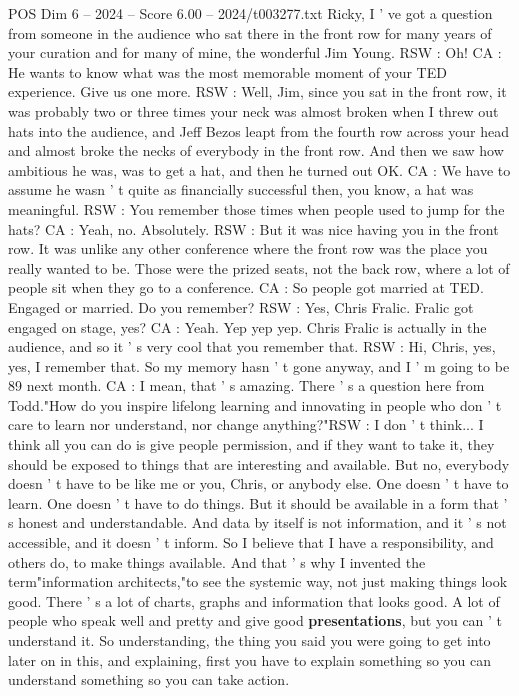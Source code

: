 \begin{textsample}{POS Dim 6 – 2024 – Score 6.00 – 2024/t003277.txt}
Ricky, I ' ve got a question from someone in the audience who sat there in the front row for many years of your curation and for many of mine, the wonderful Jim Young.
RSW : Oh!
CA : He wants to know what was the most memorable moment of your TED experience.
Give us one more.
RSW : Well, Jim, since you sat in the front row, it was probably two or three times your neck was almost broken when I threw out hats into the audience, and Jeff Bezos leapt from the fourth row across your head and almost broke the necks of everybody in the front row.
And then we saw how ambitious he was, was to get a hat, and then he turned out OK.
CA : We have to assume he wasn ' t quite as financially successful then, you know, a hat was meaningful.
RSW : You remember those times when people used to jump for the hats?
CA : Yeah, no.
Absolutely.
RSW : But it was nice having you in the front row.
It was unlike any other conference where the front row was the place you really wanted to be.
Those were the prized seats, not the back row, where a lot of people sit when they go to a conference.
CA : So people got married at TED.
Engaged or married.
Do you remember?
RSW : Yes, Chris Fralic.
Fralic got engaged on stage, yes?
CA : Yeah.
Yep yep yep.
Chris Fralic is actually in the audience, and so it ' s very cool that you remember that.
RSW : Hi, Chris, yes, yes, I remember that.
So my memory hasn ' t gone anyway, and I ' m going to be 89 next month.
CA : I mean, that ' s amazing.
There ' s a question here from Todd."How do you inspire lifelong learning and innovating in people who don ' t care to learn nor understand, nor change anything?"RSW : I don ' t think...
I think all you can do is give people permission, and if they want to take it, they should be exposed to things that are interesting and available.
But no, everybody doesn ' t have to be like me or you, Chris, or anybody else.
One doesn ' t have to learn.
One doesn ' t have to do things.
But it should be available in a form that ' s honest and understandable.
And data by itself is not information, and it ' s not accessible, and it doesn ' t inform.
So I believe that I have a responsibility, and others do, to make things available.
And that ' s why I invented the term"information architects,"to see the systemic way, not just making things look good.
There ' s a lot of charts, graphs and information that looks good.
A lot of people who speak well and pretty and give good \textbf{presentations}, but you can ' t understand it.
So understanding, the thing you said you were going to get into later on in this, and explaining, first you have to explain something so you can understand something so you can take action.

\end{textsample}
